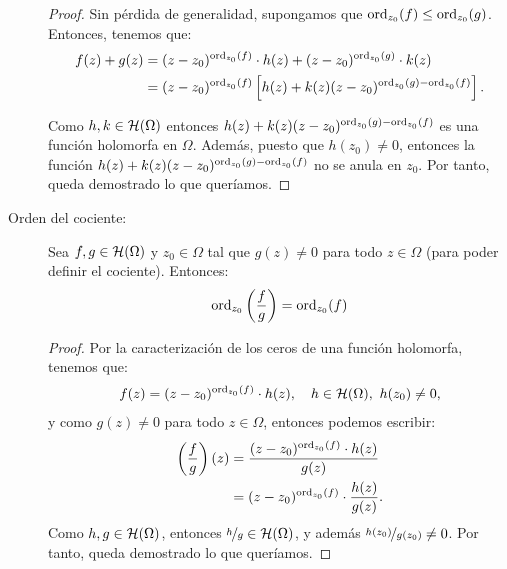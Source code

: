 \begin{ejercicio}
\begin{description}
\begin{proof}
            Sin pérdida de generalidad, supongamos que $\operatorname{ord}_{z_0}(f)\leq \operatorname{ord}_{z_0}(g)$. Entonces, tenemos que:
            \begin{align*}
                f(z)+g(z) &= (z-z_0)^{\operatorname{ord}_{z_0}(f)}\cdot h(z) + (z-z_0)^{\operatorname{ord}_{z_0}(g)}\cdot k(z) \\
                &= (z-z_0)^{\operatorname{ord}_{z_0}(f)}\left[h(z) + k(z)(z-z_0)^{\operatorname{ord}_{z_0}(g)-\operatorname{ord}_{z_0}(f)}\right].
            \end{align*}

            Como $h,k\in \mathcal{H}(\Omega)$ entonces $h(z) + k(z)(z-z_0)^{\operatorname{ord}_{z_0}(g)-\operatorname{ord}_{z_0}(f)}$ es una función holomorfa en $\Omega$. Además, puesto que $h(z_0)\neq 0$, entonces la función $h(z) + k(z)(z-z_0)^{\operatorname{ord}_{z_0}(g)-\operatorname{ord}_{z_0}(f)}$ no se anula en $z_0$. Por tanto, queda demostrado lo que queríamos.
        \end{proof}

        \item[Orden del cociente:] Sea $f,g\in \mathcal{H}(\Omega)$ y $z_0\in \Omega$ tal que $g(z)\neq 0$ para todo $z\in \Omega$ (para poder definir el cociente). Entonces:
        \begin{equation*}
            \operatorname{ord}_{z_0}\left(\frac{f}{g}\right) = \operatorname{ord}_{z_0}(f)
        \end{equation*}

        \begin{proof}
            Por la caracterización de los ceros de una función holomorfa, tenemos que:
            \begin{align*}
                f(z) &= (z-z_0)^{\operatorname{ord}_{z_0}(f)}\cdot h(z), \quad h\in \mathcal{H}(\Omega),\ h(z_0)\neq 0, \\
            \end{align*}
            y como $g(z)\neq 0$ para todo $z\in \Omega$, entonces podemos escribir:
            \begin{align*}
                \left(\frac{f}{g}\right)(z) &= \frac{(z-z_0)^{\operatorname{ord}_{z_0}(f)}\cdot h(z)}{g(z)} \\
                &= (z-z_0)^{\operatorname{ord}_{z_0}(f)}\cdot \frac{h(z)}{g(z)}.
            \end{align*}
            Como $h,g\in \mathcal{H}(\Omega)$, entonces $\nicefrac{h}{g}\in \mathcal{H}(\Omega)$, y además $\nicefrac{h(z_0)}{g(z_0)}\neq 0$. Por tanto, queda demostrado lo que queríamos.
        \end{proof}
    \end{description}

\end{ejercicio}

